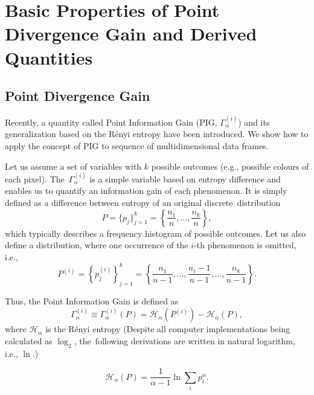 \documentclass[entropy,article,accept,moreauthors,pdftex,10pt,a4paper]{mdpi}
\begin{document}
\section{Basic Properties of Point Divergence Gain and Derived Quantities}\label{sec.2}
\unskip
\subsection{Point Divergence Gain}
\label{subsec:PDG}

Recently, a quantity called Point Information Gain (PIG, $\Gamma_{\alpha}^{(i)}$) \cite{Ryc15,Ryc16c} and its generalization based on the R\'{e}nyi entropy \cite{Ryc16a} have been introduced. We show how to apply the concept of PIG to sequence of multidimensional data frames.

Let us assume a set of variables with $k$ possible outcomes (e.g., possible colours of each pixel). The~$\Gamma_{\alpha}^{(i)}$ is a simple variable based on entropy difference and enables us to quantify an information gain of each phenomenon. It is simply defined as a difference between entropy of an original discrete~distribution
\begin{equation}\label{eq: or}
P = \{p_j\}_{j=1}^k = \left\{\frac{n_1}{n},\dots,\frac{n_k}{n}\right\},
\end{equation}
which typically describes a frequency histogram of possible outcomes. Let us also define a distribution, where one occurrence of the $i$-th phenomenon is omitted, i.e.,
\begin{equation}
P^{(i)} = \left\{p_j^{(i)}\right\}_{j=1}^k = \left\{\frac{n_1}{n-1},\dots,\frac{n_i-1}{n-1},\dots,\frac{n_k}{n-1}\right\}.
\end{equation}

Thus, the Point Information Gain is defined as
\begin{equation}
\Gamma^{(i)}_\alpha \equiv \Gamma^{(i)}_\alpha(P) = \mathscr{H}_\alpha\left(P^{(i)}\right) - \mathscr{H}_\alpha(P),
\end{equation}
where $\mathscr{H}_\alpha$ is the R\'{e}nyi entropy ({{Despite all computer
implementations} being calculated as $\log_2$, the~following derivations are written in
natural logarithm, i.e., $\ln$.})


\begin{equation}
\label{eq:Ren}
\mathscr{H}_\alpha(P) = \frac{1}{\alpha-1} \ln \sum_i p_i^{\alpha}.
\end{equation}
\end{document}
